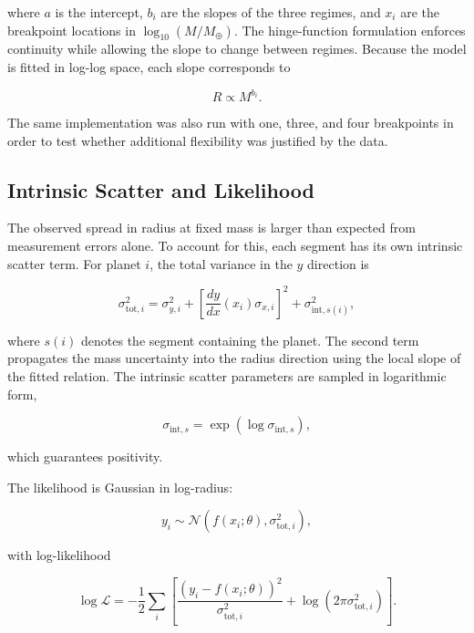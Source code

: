 \documentclass{article}
\numberwithin{equation}{section}
\begin{document}
where $a$ is the intercept, $b_i$ are the slopes of the three regimes, and $x_i$ are the breakpoint locations in $\log_{10}(M/M_\oplus)$. The hinge-function formulation enforces continuity while allowing the slope to change between regimes. Because the model is fitted in log-log space, each slope corresponds to

\begin{equation}
R \propto M^{b_i}.
\end{equation}

The same implementation was also run with one, three, and four breakpoints in order to test whether additional flexibility was justified by the data.

\subsection{Intrinsic Scatter and Likelihood}

The observed spread in radius at fixed mass is larger than expected from measurement errors alone. To account for this, each segment has its own intrinsic scatter term. For planet $i$, the total variance in the $y$ direction is

\begin{equation}
\sigma_{\mathrm{tot},i}^2
=
\sigma_{y,i}^2
+
\left[
\frac{dy}{dx}(x_i)\sigma_{x,i}
\right]^2
+
\sigma_{\mathrm{int},s(i)}^2,
\end{equation}

where $s(i)$ denotes the segment containing the planet. The second term propagates the mass uncertainty into the radius direction using the local slope of the fitted relation. The intrinsic scatter parameters are sampled in logarithmic form,

\begin{equation}
\sigma_{\mathrm{int},s} = \exp(\log \sigma_{\mathrm{int},s}),
\end{equation}

which guarantees positivity.

The likelihood is Gaussian in log-radius:

\begin{equation}
y_i \sim \mathcal{N}\left(f(x_i;\theta),\sigma_{\mathrm{tot},i}^2\right),
\end{equation}

with log-likelihood

\begin{equation}
\log \mathcal{L}
=
-\frac{1}{2}
\sum_i
\left[
\frac{(y_i-f(x_i;\theta))^2}{\sigma_{\mathrm{tot},i}^2}
+
\log(2\pi \sigma_{\mathrm{tot},i}^2)
\right].
\end{equation}
\end{document}
